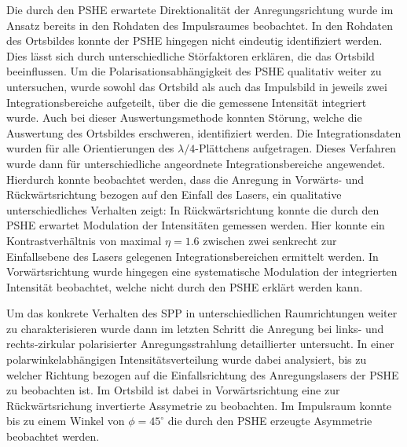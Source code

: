 \documentclass[a4paper, titlepage,  ngerman]{book}
\begin{document}
	Die durch den PSHE erwartete Direktionalität der Anregungsrichtung wurde im Ansatz bereits in den Rohdaten des Impulsraumes beobachtet. In den Rohdaten des Ortsbildes konnte der PSHE hingegen nicht eindeutig identifiziert werden. Dies lässt sich durch unterschiedliche Störfaktoren erklären, die das Ortsbild beeinflussen. Um die Polarisationsabhängigkeit des PSHE qualitativ weiter zu untersuchen, wurde sowohl das Ortsbild als auch das Impulsbild in jeweils zwei Integrationsbereiche aufgeteilt, über die die gemessene Intensität integriert wurde. Auch bei dieser Auswertungsmethode konnten Störung, welche die Auswertung des Ortsbildes erschweren, identifiziert werden. Die Integrationsdaten wurden für alle Orientierungen des $\lambda/4$-Plättchens aufgetragen. Dieses Verfahren wurde dann für unterschiedliche angeordnete Integrationsbereiche angewendet. Hierdurch konnte beobachtet werden, dass die Anregung in Vorwärts- und Rückwärtsrichtung bezogen auf den Einfall des Lasers, ein qualitative unterschiedliches Verhalten zeigt: In Rückwärtsrichtung konnte die durch den PSHE erwartet Modulation der Intensitäten gemessen werden. Hier konnte ein Kontrastverhältnis von maximal $\eta = 1.6$ zwischen zwei senkrecht zur Einfallsebene des Lasers gelegenen Integrationsbereichen ermittelt werden. In Vorwärtsrichtung wurde hingegen eine systematische Modulation der integrierten Intensität beobachtet, welche nicht durch den PSHE erklärt werden kann.
	
	Um das konkrete Verhalten des SPP in unterschiedlichen Raumrichtungen weiter zu charakterisieren wurde dann im letzten Schritt die Anregung bei links- und rechts-zirkular polarisierter Anregungsstrahlung detaillierter untersucht. In einer polarwinkelabhängigen Intensitätsverteilung wurde dabei analysiert, bis zu welcher Richtung bezogen auf die Einfallsrichtung des Anregungslasers der PSHE zu beobachten ist. Im Ortsbild ist dabei in Vorwärtsrichtung eine zur Rückwärtsrichung invertierte Assymetrie zu beobachten. Im Impulsraum konnte bis zu einem Winkel von $\phi = 45^\circ$ die durch den PSHE erzeugte Asymmetrie beobachtet werden.
    
\end{document}
